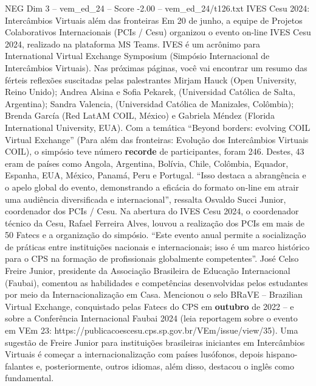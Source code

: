 \begin{textsample}{NEG Dim 3 – vem\_ed\_24 – Score -2.00 – vem\_ed\_24/t126.txt}  \label{ex:f3_neg_019}
IVES Cesu 2024: Intercâmbios Virtuais além das fronteiras Em 20 de junho, a equipe de Projetos Colaborativos Internacionais (PCIs / Cesu) organizou o evento on-line IVES Cesu 2024, realizado na plataforma MS Teams.
IVES é um acrônimo para International Virtual Exchange Symposium (Simpósio Internacional de Intercâmbios Virtuais).
Nas próximas páginas, você vai encontrar um resumo das férteis reflexões suscitadas pelas palestrantes Mirjam Hauck (Open University, Reino Unido); Andrea Alsina e Sofia Pekarek, (Universidad Católica de Salta, Argentina); Sandra Valencia, (Universidad Católica de Manizales, Colômbia); Brenda García (Red LatAM COIL, México) e Gabriela Méndez (Florida International University, EUA).
Com a temática “Beyond borders: evolving COIL Virtual Exchange” (Para além das fronteiras: Evolução dos Intercâmbios Virtuais COIL), o simpósio teve número \textbf{recorde} de participantes, foram 246.
Destes, 43 eram de países como Angola, Argentina, Bolívia, Chile, Colômbia, Equador, Espanha, EUA, México, Panamá, Peru e Portugal. “Isso destaca a abrangência e o apelo global do evento, demonstrando a eficácia do formato on-line em atrair uma audiência diversificada e internacional”, ressalta Osvaldo Succi Junior, coordenador dos PCIs / Cesu.
Na abertura do IVES Cesu 2024, o coordenador técnico da Cesu, Rafael Ferreira Alves, louvou a realização dos PCIs em mais de 50 Fatecs e a organização do simpósio. “Este evento anual permite a socialização de práticas entre instituições nacionais e internacionais; isso é um marco histórico para o CPS na formação de profissionais globalmente competentes”.
José Celso Freire Junior, presidente da Associação Brasileira de Educação Internacional (Faubai), comentou as habilidades e competências desenvolvidas pelos estudantes por meio da Internacionalização em Casa.
Mencionou o selo BRaVE – Brazilian Virtual Exchange, conquistado pelas Fatecs do CPS em \textbf{outubro} de 2022 – e sobre a Conferência Internacional Faubai 2024 (leia reportagem sobre o evento em VEm 23: https://publicacoescesu.cps.sp.gov.br/VEm/issue/view/35).
Uma sugestão de Freire Junior para instituições brasileiras iniciantes em Intercâmbios Virtuais é começar a internacionalização com países lusófonos, depois hispano-falantes e, posteriormente, outros idiomas, além disso, destacou o inglês como fundamental.

\end{textsample}
